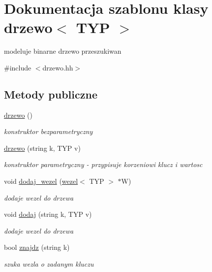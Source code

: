 \hypertarget{classdrzewo}{\section{Dokumentacja szablonu klasy drzewo$<$ T\-Y\-P $>$}
\label{classdrzewo}
}


modeluje binarne drzewo przeszukiwan  




{\ttfamily \#include $<$drzewo.\-hh$>$}

\subsection*{Metody publiczne}
\begin{DoxyCompactItemize}
\item 
\hyperlink{classdrzewo_ad43b2e4e82dc089736b57064865fa449}{drzewo} ()
\begin{DoxyCompactList}\small\item\em konstruktor bezparametryczny \end{DoxyCompactList}\item 
\hyperlink{classdrzewo_abaa93ec27e55b1a58c747f680446ffd4}{drzewo} (string k, T\-Y\-P v)
\begin{DoxyCompactList}\small\item\em konstruktor parametryczny -\/ przypisuje korzeniowi klucz i wartosc \end{DoxyCompactList}\item 
void \hyperlink{classdrzewo_a9c52aa0c3842425ff5900429bbf0c43d}{dodaj\-\_\-wezel} (\hyperlink{classwezel}{wezel}$<$ T\-Y\-P $>$ $\ast$W)
\begin{DoxyCompactList}\small\item\em dodaje wezel do drzewa \end{DoxyCompactList}\item 
void \hyperlink{classdrzewo_a53ccf9b49a62bcb6b5dfab4e48415cc1}{dodaj} (string k, T\-Y\-P v)
\begin{DoxyCompactList}\small\item\em dodaje wezel do drzewa \end{DoxyCompactList}\item 
bool \hyperlink{classdrzewo_ad9d512467919623595126d88bdb60974}{znajdz} (string k)
\begin{DoxyCompactList}\small\item\em szuka wezla o zadanym kluczu \end{DoxyCompactList}\item 

\end{DoxyCompactItemize}

